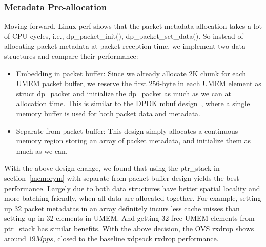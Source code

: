 \documentclass[10pt]{sigplanconf}
\begin{document}
\subsubsection{Metadata Pre-allocation}
Moving forward, Linux perf shows that the packet metadata allocation
takes a lot of CPU cycles, i.e.,  dp\_packet\_init(), dp\_packet\_set\_data().
So instead of allocating packet metadata at packet reception time, we
implement two data structures and compare their performance:
\begin{itemize}
\item Embedding in packet buffer: Since we already allocate 2K chunk for each
UMEM packet buffer, we reserve the first 256-byte in each UMEM element as struct dp\_packet
and initialize the dp\_packet as much as we can at allocation time.
This is similar to the DPDK mbuf design~\cite{dpdkmbuf}, where a single memory buffer
is used for both packet data and metadata.
\item Separate from packet buffer: This design simply allocates a continuous memory region
storing an array of packet metadata, and initialize them as much as we can.
\end{itemize}


With the above design change, we found that using the ptr\_stack in section~\ref{memorym} with
separate from packet buffer design yields the best performance. Largely due to both data structures
have better spatial locality and more batching friendly, when all data are allocated together.
For example, setting up 32 packet metadatas in an array definitely incurs
less cache misses than setting up in 32 elements in UMEM.
And getting 32 free UMEM elements from ptr\_stack has similar benefits.
With the above decision, the OVS rxdrop shows around $19Mpps$, closed
to the baseline xdpsock rxdrop performance.
\end{document}
